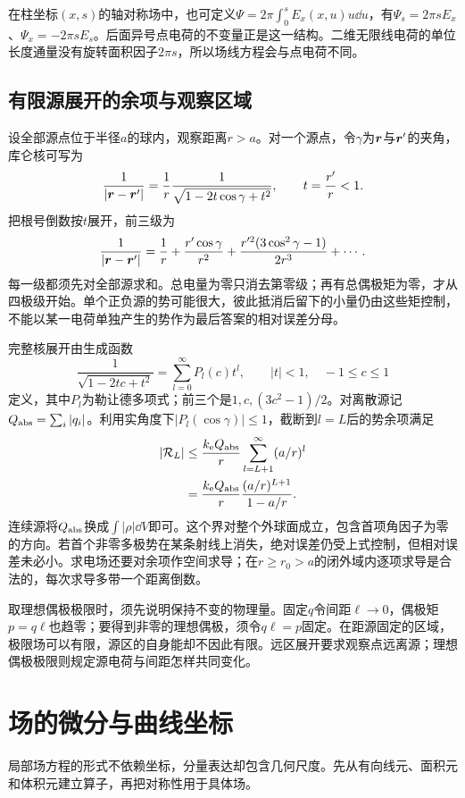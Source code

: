 在柱坐标$(x,s)$的轴对称场中，也可定义$\Psi=2\pi\int_0^s E_x(x,u)u\dd u$，有$\Psi_s=2\pi sE_x$、$\Psi_x=-2\pi sE_s$。后面异号点电荷的不变量正是这一结构。二维无限线电荷的单位长度通量没有旋转面积因子$2\pi s$，所以场线方程会与点电荷不同。


\subsection{有限源展开的余项与观察区域}\label{sec:es-series-error}
设全部源点位于半径$a$的球内，观察距离$r>a$。对一个源点，令$\gamma$为$\bm{r}$与$\bm{r}'$的夹角，库仑核可写为
\[\frac1{|\bm{r}-\bm{r}'|}
=\frac1r\frac1{\sqrt{1-2t\cos\gamma+t^2}},\qquad t=\frac{r'}r<1.
\]
把根号倒数按$t$展开，前三级为
\[\frac1{|\bm{r}-\bm{r}'|}=\frac1r+
\frac{r'\cos\gamma}{r^2}+
\frac{r'^2(3\cos^2\gamma-1)}{2r^3}+\cdots.
\]
每一级都须先对全部源求和。总电量为零只消去第零级；再有总偶极矩为零，才从四极级开始。单个正负源的势可能很大，彼此抵消后留下的小量仍由这些矩控制，不能以某一电荷单独产生的势作为最后答案的相对误差分母。

完整核展开由生成函数
\[\frac1{\sqrt{1-2tc+t^2}}=\sum_{l=0}^{\infty}P_l(c)t^l,
\qquad |t|<1,\quad -1\le c\le1
\]
定义，其中$P_l$为勒让德多项式；前三个是$1,c,(3c^2-1)/2$。对离散源记$Q_{\rm abs}=\sum_i|q_i|$。利用实角度下$|P_l(\cos\gamma)|\le1$，截断到$l=L$后的势余项满足
\[\begin{aligned}
|\mathcal R_L|&\le\frac{k_{\rm e} Q_{\rm abs}}r
\sum_{l=L+1}^{\infty}(a/r)^l\\
&=\frac{k_{\rm e} Q_{\rm abs}}r
\frac{(a/r)^{L+1}}{1-a/r}.
\end{aligned}\]
连续源将$Q_{\rm abs}$换成$\int|\rho|\dd V$即可。这个界对整个外球面成立，包含首项角因子为零的方向。若首个非零多极势在某条射线上消失，绝对误差仍受上式控制，但相对误差未必小。求电场还要对余项作空间求导；在$r\ge r_0>a$的闭外域内逐项求导是合法的，每次求导多带一个距离倒数。

取理想偶极极限时，须先说明保持不变的物理量。固定$q$令间距$\ell\to0$，偶极矩$p=q\ell$也趋零；要得到非零的理想偶极，须令$q\ell=p$固定。在距源固定的区域，极限场可以有限，源区的自身能却不因此有限。远区展开要求观察点远离源；理想偶极极限则规定源电荷与间距怎样共同变化。



\section{场的微分与曲线坐标}\label{sec:es1-operators}
局部场方程的形式不依赖坐标，分量表达却包含几何尺度。先从有向线元、面积元和体积元建立算子，再把对称性用于具体场。

